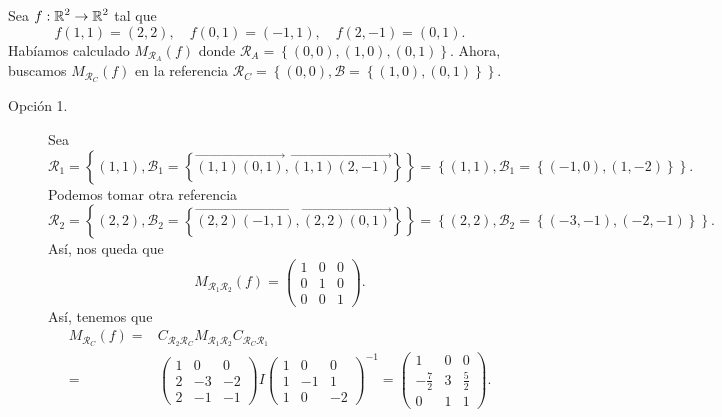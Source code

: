 \begin{eg}
Sea $\displaystyle f : \mathbb{R}^{2} \to \mathbb{R}^{2} $ tal que 
\[f\left(1,1\right) = \left(2,2\right), \quad f\left(0,1\right) = \left(-1,1\right), \quad f\left(2,-1\right) = \left(0,1\right) .\]
Habíamos calculado $\displaystyle M_{\mathcal{R}_{A}}\left(f\right) $ donde $\displaystyle \mathcal{R}_{A} = \left\{ \left(0,0\right), \left(1,0\right), \left(0,1\right)\right\}  $. Ahora, buscamos $\displaystyle M_{\mathcal{R}_{C}}\left(f\right) $ en la referencia $\displaystyle \mathcal{R}_{C} = \left\{ \left(0,0\right), \mathcal{B} = \left\{ \left(1,0\right), \left(0,1\right)\right\} \right\}  $. 
\begin{description}
	\item[Opción 1.] Sea 
		\[  \mathcal{R}_{1} = \left\{ \left(1,1\right), \mathcal{B}_{1} = \left\{ \overrightarrow{\left(1,1\right)\left(0,1\right)}, \overrightarrow{\left(1,1\right)\left(2,-1\right)}\right\} \right\} = \left\{ \left(1,1\right), \mathcal{B}_{1} = \left\{ \left(-1,0\right),\left(1,-2\right)\right\} \right\} .\]
	Podemos tomar otra referencia 
	\[\mathcal{R}_{2} = \left\{ \left(2,2\right), \mathcal{B}_{2} = \left\{ \overrightarrow{\left(2,2\right)\left(-1,1\right)},\overrightarrow{\left(2,2\right)\left(0,1\right)}\right\} \right\} = \left\{ \left(2,2\right), \mathcal{B}_{2} = \left\{ \left(-3,-1\right),\left(-2,-1\right)\right\} \right\}  .\]
	Así, nos queda que
	\[M_{\mathcal{R}_{1}\mathcal{R}_{2}}\left(f\right) = \begin{pmatrix} 1 & 0 & 0 \\
	0 & 1&0 \\
0 &0 &1 \end{pmatrix} .\]
Así, tenemos que 
\[
\begin{split}
	M_{\mathcal{R}_{C}}\left(f\right) = & C_{\mathcal{R}_{2}\mathcal{R}_{C}}M_{\mathcal{R}_{1}\mathcal{R}_{2}}C_{\mathcal{R}_{C}\mathcal{R}_{1}}\\
	= & \begin{pmatrix} 1 & 0 & 0 \\ 2 & -3 & - 2 \\ 2 & - 1 & - 1 \end{pmatrix} I \begin{pmatrix} 1 &  0 & 0 \\ 1 & - 1 & 1 \\ 1 & 0 & -2 \end{pmatrix}^{-1} = \begin{pmatrix} 1 & 0 & 0 \\ -\frac{7}{2} & 3 & \frac{5}{2} \\ 0 & 1 & 1 \end{pmatrix}.

\end{split}\]
\end{description}
\end{eg}
